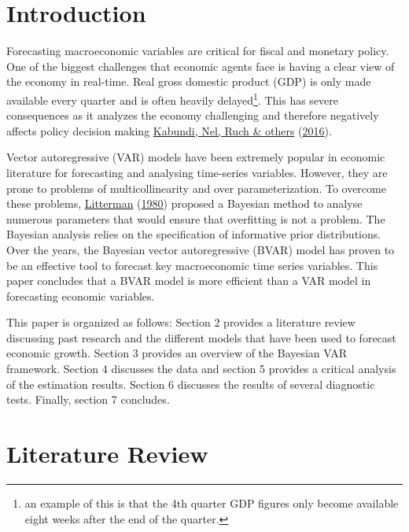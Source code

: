 \documentclass[11pt,preprint, authoryear]{elsarticle}
\numberwithin{equation}{section}
\numberwithin{figure}{section}
\numberwithin{table}{section}
\let\rmarkdownfootnote\footnote%
\def\footnote{\protect\rmarkdownfootnote}
\begin{document}
\hypertarget{introduction}{%
\section{\texorpdfstring{Introduction
\label{Introduction}}{Introduction }}\label{introduction}}

Forecasting macroeconomic variables are critical for fiscal and monetary
policy. One of the biggest challenges that economic agents face is
having a clear view of the economy in real-time. Real gross domestic
product (GDP) is only made available every quarter and is often heavily
delayed\footnote{an example of this is that the 4th quarter GDP figures only become available eight weeks after the end of the quarter.}.
This has severe consequences as it analyzes the economy challenging and
therefore negatively affects policy decision making
\protect\hyperlink{ref-kabundi}{Kabundi, Nel, Ruch \& others}
(\protect\hyperlink{ref-kabundi}{2016}).

Vector autoregressive (VAR) models have been extremely popular in
economic literature for forecasting and analysing time-series variables.
However, they are prone to problems of multicollinearity and over
parameterization. To overcome these problems,
\protect\hyperlink{ref-litter}{Litterman}
(\protect\hyperlink{ref-litter}{1980}) proposed a Bayesian method to
analyse numerous parameters that would ensure that overfitting is not a
problem. The Bayesian analysis relies on the specification of
informative prior distributions. Over the years, the Bayesian vector
autoregressive (BVAR) model has proven to be an effective tool to
forecast key macroeconomic time series variables. This paper concludes
that a BVAR model is more efficient than a VAR model in forecasting
economic variables.

This paper is organized as follows: Section 2 provides a literature
review discussing past research and the different models that have been
used to forecast economic growth. Section 3 provides an overview of the
Bayesian VAR framework. Section 4 discusses the data and section 5
provides a critical analysis of the estimation results. Section 6
discusses the results of several diagnostic tests. Finally, section 7
concludes.

\hypertarget{literature-review}{%
\section{Literature Review}\label{literature-review}}
\end{document}
